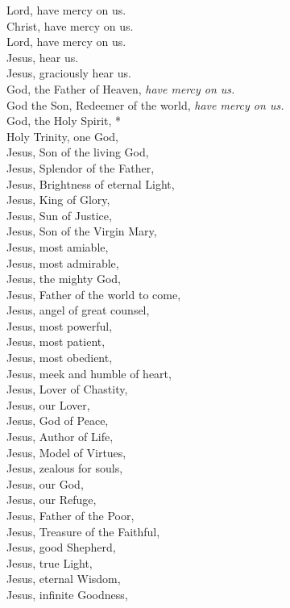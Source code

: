 \documentclass{article}
\begin{document}
\begin{multicols}{3}
Lord, have mercy on us.\\
Christ, have mercy on us.\\
Lord, have mercy on us.\\
Jesus, hear us.\\
Jesus, graciously hear us.\\
God, the Father of Heaven, \textit{have mercy on us.}\\
God the Son, Redeemer of the world, \textit{have mercy on us.}\\
God, the Holy Spirit, *\\
Holy Trinity, one God,\\
Jesus, Son of the living God,\\
Jesus, Splendor of the Father,\\
Jesus, Brightness of eternal Light,\\
Jesus, King of Glory,\\
Jesus, Sun of Justice,\\
Jesus, Son of the Virgin Mary,\\
Jesus, most amiable,\\
Jesus, most admirable,\\ 
Jesus, the mighty God,\\
Jesus, Father of the world to come,\\ 
Jesus, angel of great counsel,\\
Jesus, most powerful,\\
Jesus, most patient,\\
Jesus, most obedient,\\
Jesus, meek and humble of heart,\\ 
Jesus, Lover of Chastity,\\
Jesus, our Lover,\\
Jesus, God of Peace,\\ 
Jesus, Author of Life,\\ 
Jesus, Model of Virtues,\\ 
Jesus, zealous for souls,\\
Jesus, our God,\\
Jesus, our Refuge,\\ 
Jesus, Father of the Poor,\\ 
Jesus, Treasure of the Faithful,\\
Jesus, good Shepherd,\\
Jesus, true Light,\\
Jesus, eternal Wisdom,\\ 
Jesus, infinite Goodness,\\ 

\end{multicols}
\end{document}
